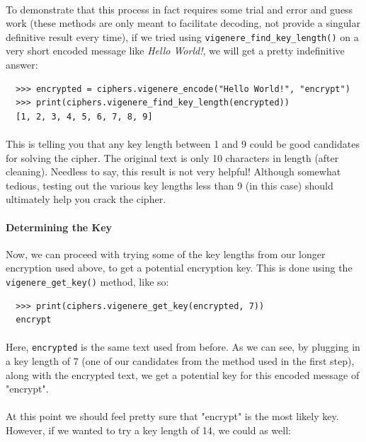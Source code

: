 \documentclass[12pt,a4paper]{article}
\begin{document}
\paragraph{}
To demonstrate that this process in fact requires some trial and error and 
guess work (these methods are only meant to facilitate decoding, not provide 
a singular definitive result every time), if we tried using 
\verb|vigenere_find_key_length()| on a very short encoded message like 
\textit{Hello World!}, we will get a pretty indefinitive answer:

\begin{verbatim}
  >>> encrypted = ciphers.vigenere_encode("Hello World!", "encrypt")
  >>> print(ciphers.vigenere_find_key_length(encrypted))
  [1, 2, 3, 4, 5, 6, 7, 8, 9]
\end{verbatim}

\paragraph{}
This is telling you that any key length between 1 and 9 could be 
good candidates for solving the cipher.  The original text is only 10 
characters in length (after cleaning).  Needless to say, this result is not 
very helpful!  Although somewhat tedious, testing out the various key lengths 
less than 9 (in this case) should ultimately help you crack the cipher.

\paragraph{Determining the Key}
Now, we can proceed with trying some of the key lengths from our longer 
encryption used above, to get a potential encryption key.  This is done using 
the \verb|vigenere_get_key()| method, like so:

\begin{verbatim}
  >>> print(ciphers.vigenere_get_key(encrypted, 7))
  encrypt
\end{verbatim}

\paragraph{}
Here, \verb|encrypted| is the same text used from before.  As we can see, by 
plugging in a key length of 7 (one of our candidates from the method used in the 
first step), along with the encrypted text, we get a potential key for this 
encoded message of "encrypt".

\paragraph{}
At this point we should feel pretty sure that "encrypt" is the most likely key.  
However, if we wanted to try a key length of 14, we could as well:
\end{document}
